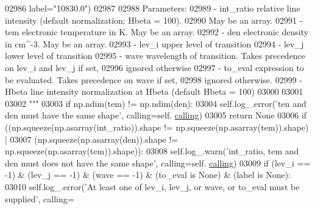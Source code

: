 \begin{DoxyCode}
02986 \textcolor{stringliteral}{                label="10830.0")}
02987 \textcolor{stringliteral}{            }
02988 \textcolor{stringliteral}{        Parameters:}
02989 \textcolor{stringliteral}{            - int\_ratio    relative line intensity (default normalization: Hbeta = 100). }
02990 \textcolor{stringliteral}{                            May be an array.}
02991 \textcolor{stringliteral}{            - tem          electronic temperature in K. May be an array.}
02992 \textcolor{stringliteral}{            - den          electronic density in cm^-3. May be an array.}
02993 \textcolor{stringliteral}{            - lev\_i        upper level of transition}
02994 \textcolor{stringliteral}{            - lev\_j        lower level of transition}
02995 \textcolor{stringliteral}{            - wave         wavelength of transition. Takes precedence on lev\_i and lev\_j if set, }
02996 \textcolor{stringliteral}{                            ignored otherwise }
02997 \textcolor{stringliteral}{            - to\_eval      expression to be evaluated. Takes precedence on wave if set, }
02998 \textcolor{stringliteral}{                            ignored otherwise.}
02999 \textcolor{stringliteral}{            - Hbeta        line intensity normalization at Hbeta (default Hbeta = 100)}
03000 \textcolor{stringliteral}{}
03001 \textcolor{stringliteral}{        }
03002 \textcolor{stringliteral}{        """}
03003         \textcolor{keywordflow}{if} np.ndim(tem) != np.ndim(den):
03004             self.log\_.error(\textcolor{stringliteral}{'ten and den must have the same shape'}, calling=self.
      \hyperlink{classpyneb_1_1core_1_1pynebcore_1_1_rec_atom_a82ec425ebba32b73a5d9ae52717d47c4}{calling})
03005             \textcolor{keywordflow}{return} \textcolor{keywordtype}{None}
03006         \textcolor{keywordflow}{if} ((np.squeeze(np.asarray(int\_ratio)).shape != np.squeeze(np.asarray(tem)).shape) | 
03007             (np.squeeze(np.asarray(den)).shape != np.squeeze(np.asarray(tem)).shape)):
03008             self.log\_.warn(\textcolor{stringliteral}{'int\_ratio, tem and den must does not have the same shape'}, calling=self.
      \hyperlink{classpyneb_1_1core_1_1pynebcore_1_1_rec_atom_a82ec425ebba32b73a5d9ae52717d47c4}{calling})
03009         \textcolor{keywordflow}{if} (lev\_i == -1) & (lev\_j == -1) & (wave == -1) & (to\_eval \textcolor{keywordflow}{is} \textcolor{keywordtype}{None}) & (label \textcolor{keywordflow}{is} \textcolor{keywordtype}{None}):
03010             self.log\_.error(\textcolor{stringliteral}{'At least one of lev\_i, lev\_j, or wave, or to\_eval must be supplied'}, calling=

\end{DoxyCode}
